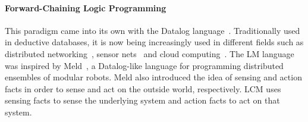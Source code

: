 \paragraph{Forward-Chaining Logic Programming}
This paradigm came into its own with the Datalog
language~\cite{Ullman:1990:PDK:533142}.  Traditionally used in deductive
databases, it is now being increasingly used in different fields such as
distributed networking~\cite{Loo-condie-garofalakis-p2}, sensor
nets~\cite{Chu:2007:DID:1322263.1322281} and cloud computing~\cite{alvaro:boom}.
The LM language was inspired by Meld~\cite{ashley-rollman-iclp09}, a
Datalog-like language for programming distributed ensembles of modular robots.
Meld also introduced the idea of sensing and action facts in order to sense and act
on the outside world, respectively. LCM uses sensing facts to sense the
underlying system and action facts to act on that system.
